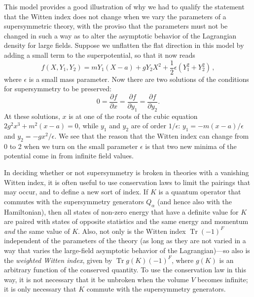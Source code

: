 This model provides a good illustration of why we had to qualify the
statement that the Witten index does not change when we vary the
parameters of a supersymmetric theory, with the proviso that the
parameters must not be changed in such a way as to alter the asymptotic
behavior of the Lagrangian density for large fields. Suppose we unflatten
the flat direction in this model by adding a small term to the
superpotential, so that it now reads
\[
  f(X,Y_1,Y_2)
  =
  mY_1(X-a)+gY_2X^2+\frac12\epsilon(Y_1^2+Y_2^2)\,,
\]
where \(\epsilon\) is a small mass parameter. Now there are two solutions
of the conditions for supersymmetry to be preserved:
\[
  0=\frac{\partial f}{\partial x}
   =\frac{\partial f}{\partial y_1}
   =\frac{\partial f}{\partial y_2}.
\]
At these solutions, \(x\) is at one of the roots of the cubic
equation \(2g^2x^3+m^2(x-a)=0\), while \(y_1\) and \(y_2\) are of order
\(1/\epsilon\): \(y_1=-m(x-a)/\epsilon\) and
\(y_2=-gx^2/\epsilon\). We see that the reason that the Witten index can
change from 0 to 2 when we turn on the small parameter \(\epsilon\) is
that two new minima of the potential come in from infinite field values.

In deciding whether or not supersymmetry is broken in theories with a
vanishing Witten index, it is often useful to use conservation laws to
limit the pairings that may occur, and to define a new sort of index. If
\(K\) is a quantum operator that commutes with the supersymmetry
generators \(Q_\alpha\) (and hence also with the Hamiltonian), then all
states of non-zero energy that have a definite value for \(K\) are paired
with states of opposite statistics and the same energy and momentum
\emph{and} the same value of \(K\). Also, not only is the Witten index
\(\operatorname{Tr}(-1)^F\) independent of the parameters of the theory
(as long as they are not varied in a way that varies the large-field
asymptotic behavior of the Lagrangian)---so also is the \emph{weighted
Witten index}, given by \(\operatorname{Tr}g(K)(-1)^F\), where \(g(K)\)
is an arbitrary function of the conserved quantity. To use the
conservation law in this way, it is not necessary that it be unbroken when
the volume \(V\) becomes infinite; it is only necessary that \(K\) commute
with the supersymmetry generators.

